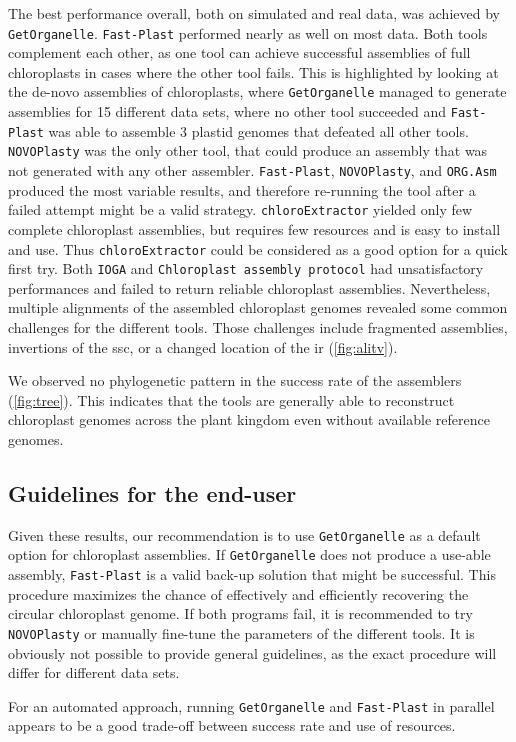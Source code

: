 \documentclass{bmcart}
\newcommand{\formatprogramnames}[1]{\texttt{#1}}
\newcommand{\ce}{\formatprogramnames{chloroExtractor}}
\newcommand{\oa}{\formatprogramnames{ORG.Asm}}
\newcommand{\fp}{\formatprogramnames{Fast-Plast}}
\newcommand{\ioga}{\formatprogramnames{IOGA}}
\newcommand{\np}{\formatprogramnames{NOVOPlasty}}
\newcommand{\go}{\formatprogramnames{GetOrganelle}}
\newcommand{\cassp}{\formatprogramnames{Chloroplast assembly protocol}}
\begin{document}
The best performance overall, both on simulated and real data, was achieved by \go{}. \fp{} performed nearly as well on most data.
Both tools complement each other, as one tool can achieve successful assemblies of full chloroplasts in cases where the other tool fails. 
This is highlighted by looking at the de-novo assemblies of chloroplasts, where \go{} managed to generate assemblies for 15 different data sets, where no other tool succeeded and \fp{} was able to assemble 3 plastid genomes that defeated all other tools. \np{} was the only other tool, that could produce an assembly that was not generated with any other assembler. 
\fp{}, \np{}, and \oa{} produced the most variable results, and therefore re-running the tool after a failed attempt might be a valid strategy.
\ce{} yielded only few complete chloroplast assemblies, but requires few resources and is easy to install and use. 
Thus \ce{} could be considered as a good option for a quick first try.
Both \ioga{} and \cassp{} had unsatisfactory performances and failed to return reliable chloroplast assemblies.
Nevertheless, multiple alignments of the assembled chloroplast genomes revealed some common challenges for the different tools. 
Those challenges include fragmented assemblies, invertions of the \gls{ssc}, or a changed location of the \gls{ir} (\cref{fig:alitv}).

We observed no phylogenetic pattern in the success rate of the assemblers (\cref{fig:tree}).
This indicates that the tools are generally able to reconstruct chloroplast genomes across the plant kingdom even without available reference genomes.

\subsection*{Guidelines for the end-user}
Given these results, our recommendation is to use \go{} as a default option for chloroplast assemblies. 
If \go{} does not produce a use-able assembly, \fp{} is a valid back-up solution that might be successful. 
This procedure maximizes the chance of effectively and efficiently recovering the circular chloroplast genome.
If both programs fail, it is recommended to try \np{} or manually fine-tune the parameters of the different tools.
It is obviously not possible to provide general guidelines, as the exact procedure will differ for different data sets.
 
For an automated approach, running \go{} and \fp{} in parallel appears to be a good trade-off between success rate and use of resources.
\end{document}
